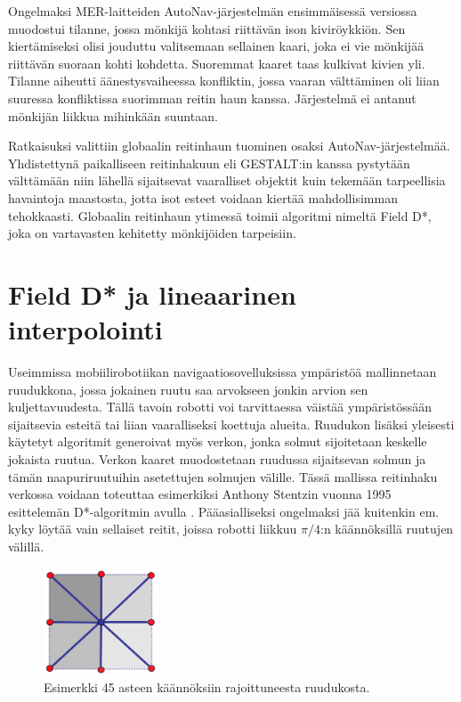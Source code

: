 \documentclass[finnish]{tktltiki2}
\theoremstyle{definition}
\theoremstyle{remark}
\begin{document}
Ongelmaksi MER-laitteiden AutoNav-järjestelmän ensimmäisessä versiossa muodostui tilanne, jossa mönkijä kohtasi riittävän ison kiviröykkiön. Sen kiertämiseksi olisi jouduttu valitsemaan sellainen kaari, joka ei vie mönkijää riittävän suoraan kohti kohdetta. Suoremmat kaaret taas kulkivat kivien yli. Tilanne aiheutti äänestysvaiheessa konfliktin, jossa vaaran välttäminen oli liian suuressa konfliktissa suorimman reitin haun kanssa. Järjestelmä ei antanut mönkijän liikkua mihinkään suuntaan.

Ratkaisuksi valittiin globaalin reitinhaun tuominen osaksi AutoNav-järjestelmää. Yhdistettynä paikalliseen reitinhakuun eli GESTALT:in kanssa pystytään välttämään niin lähellä sijaitsevat vaaralliset objektit kuin tekemään tarpeellisia havaintoja maastosta, jotta isot esteet voidaan kiertää mahdollisimman tehokkaasti. Globaalin reitinhaun ytimessä toimii algoritmi nimeltä Field D*, joka on vartavasten kehitetty mönkijöiden tarpeisiin.\cite{marsjuttuja}

\section{Field D* ja lineaarinen interpolointi}
Useimmissa mobiilirobotiikan navigaatiosovelluksissa ympäristöä mallinnetaan ruudukkona, jossa jokainen ruutu saa arvokseen jonkin arvion sen kuljettavuudesta. Tällä tavoin robotti voi tarvittaessa väistää ympäristössään sijaitsevia esteitä tai liian vaaralliseksi koettuja alueita. Ruudukon lisäksi yleisesti käytetyt algoritmit generoivat myös verkon, jonka solmut sijoitetaan keskelle jokaista ruutua. Verkon kaaret muodostetaan ruudussa sijaitsevan solmun ja tämän naapuriruutuihin asetettujen solmujen välille. Tässä mallissa reitinhaku verkossa voidaan toteuttaa esimerkiksi Anthony Stentzin vuonna 1995 esittelemän D*-algoritmin avulla \cite{stentz1995focussed}. Pääasialliseksi ongelmaksi jää kuitenkin em. kyky löytää vain sellaiset reitit, joissa robotti liikkuu $\pi/4$:n käännöksillä ruutujen välillä.

\begin{figure}[H]
	\centering
		\includegraphics[width=0.3\textwidth]{old_grid}
	\caption{Esimerkki 45 asteen käännöksiin rajoittuneesta ruudukosta. \cite{marsjuttuja}}
\end{figure}
\end{document}
